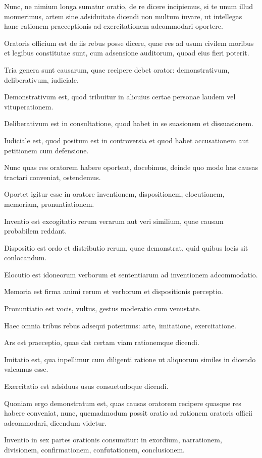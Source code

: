 Nunc, ne nimium longa sumatur oratio, de re dicere incipiemus, si te unum illud monuerimus, artem sine adsiduitate dicendi non multum iuvare, ut intellegas hanc rationem praeceptionis ad exercitationem adcommodari oportere.


Oratoris officium est de iis rebus posse dicere, quae res ad usum civilem moribus et legibus constitutae sunt, cum adsensione auditorum, quoad eius fieri poterit.

Tria genera sunt causarum, quae recipere debet orator: demonstrativum, deliberativum, iudiciale.

Demonstrativum est, quod tribuitur in alicuius certae personae laudem vel vituperationem.

Deliberativum est in consultatione, quod habet in se suasionem et dissuasionem.

Iudiciale est, quod positum est in controversia et quod habet accusationem aut petitionem cum defensione.

Nunc quas res oratorem habere oporteat, docebimus, deinde quo modo has causas tractari conveniat, ostendemus.


Oportet igitur esse in oratore inventionem, dispositionem, elocutionem, memoriam, pronuntiationem.

Inventio est excogitatio rerum verarum aut veri similium, quae causam probabilem reddant.

Dispositio est ordo et distributio rerum, quae demonstrat, quid quibus locis sit conlocandum.

Elocutio est idoneorum verborum et sententiarum ad inventionem adcommodatio.

Memoria est firma animi rerum et verborum et dispositionis perceptio.

Pronuntiatio est vocis, vultus, gestus moderatio cum venustate.

Haec omnia tribus rebus adsequi poterimus: arte, imitatione, exercitatione.

Ars est praeceptio, quae dat certam viam rationemque dicendi.

Imitatio est, qua inpellimur cum diligenti ratione ut aliquorum similes in dicendo valeamus esse.

Exercitatio est adsiduus usus consuetudoque dicendi.

Quoniam ergo demonstratum est, quas causas oratorem recipere quasque res habere conveniat, nunc, quemadmodum possit oratio ad rationem oratoris officii adcommodari, dicendum videtur.

Inventio in sex partes orationis consumitur: in exordium, narrationem, divisionem, confirmationem, confutationem, conclusionem.

